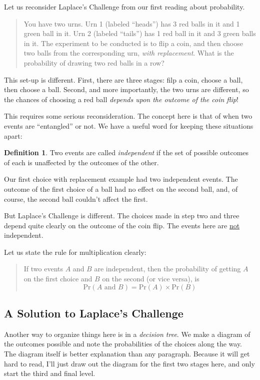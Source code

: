 \documentclass[12pt,letterpaper]{article}
\theoremstyle{definition}
\newtheorem*{definition}{Definition}
\begin{document}
Let us reconsider Laplace's Challenge from our first reading about probability.

\begin{quotation}
You have two urns.
Urn 1 (labeled ``heads'') has 3 red balls in it and 1 green ball in it.
Urn 2 (labeled ``tails'') has 1 red ball in it and 3 green balls in it.
The experiment to be conducted is to flip a coin, and then choose two balls from the corresponding urn, \emph{with replacement}. 
What is the probability of drawing two red balls in a row?
\end{quotation}

This set-up is different.
First, there are three stages: filp a coin, choose a ball, then choose a ball.
Second, and more importantly, the two urns are different, so the chances of choosing a red ball \emph{depends upon the outcome of the coin flip}!

This requires some serious reconsideration.
The concept here is that of when two events are ``entangled'' or not.
We have a useful word for keeping these situations apart:

\begin{definition} Two events are called \emph{independent} if the set of possible outcomes of each is unaffected by the outcomes of the other.
\end{definition}

Our first choice with replacement example had two independent events.
The outcome of the first choice of a ball had no effect on the second ball, and, of course, the second ball couldn't affect the first.

But Laplace's Challenge is different.
The choices made in step two and three depend quite clearly on the outcome of the coin flip.
The events here are \underline{not} independent.

Let us state the rule for multiplication clearly:
\begin{quotation}
If two events $A$ and $B$ are independent, then the probability of getting $A$ on the first choice and $B$ on the second (or vice versa), is
\[
\mathrm{Pr}(\text{$A$ and $B$}) = \mathrm{Pr}(A) \times \mathrm{Pr}(B)
\]
\end{quotation}


\subsection*{A Solution to Laplace's Challenge} %

Another way to organize things here is in a \emph{decision tree}.
We make a diagram of the outcomes possible and note the probabilities of the choices along the way.
The diagram itself is better explanation than any paragraph.
Because it will get hard to read, I'll just draw out the diagram for the first two stages here, and only start the third and final level.
\end{document}
